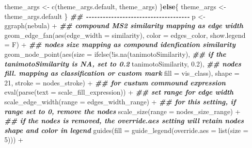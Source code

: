 \documentclass[
]{article}
\newenvironment{Shaded}{\begin{snugshade}}{\end{snugshade}}
\newcommand{\AttributeTok}[1]{\textcolor[rgb]{0.77,0.63,0.00}{#1}}
\newcommand{\ControlFlowTok}[1]{\textcolor[rgb]{0.13,0.29,0.53}{\textbf{#1}}}
\newcommand{\DecValTok}[1]{\textcolor[rgb]{0.00,0.00,0.81}{#1}}
\newcommand{\DocumentationTok}[1]{\textcolor[rgb]{0.56,0.35,0.01}{\textbf{\textit{#1}}}}
\newcommand{\FloatTok}[1]{\textcolor[rgb]{0.00,0.00,0.81}{#1}}
\newcommand{\FunctionTok}[1]{\textcolor[rgb]{0.00,0.00,0.00}{#1}}
\newcommand{\NormalTok}[1]{#1}
\newcommand{\OtherTok}[1]{\textcolor[rgb]{0.56,0.35,0.01}{#1}}
\newcommand{\SpecialCharTok}[1]{\textcolor[rgb]{0.00,0.00,0.00}{#1}}
\begin{document}
\begin{Shaded}
\begin{Highlighting}[]
\NormalTok{      theme\_args }\OtherTok{\textless{}{-}} \FunctionTok{c}\NormalTok{(theme\_args.default, theme\_args)}
\NormalTok{    \}}\ControlFlowTok{else}\NormalTok{\{}
\NormalTok{      theme\_args }\OtherTok{\textless{}{-}}\NormalTok{ theme\_args.default}
\NormalTok{    \}}
    \DocumentationTok{\#\# {-}{-}{-}{-}{-}{-}{-}{-}{-}{-}{-}{-}{-}{-}{-}{-}{-}{-}{-}{-}{-}{-}{-}{-}{-}{-}{-}{-}{-}{-}{-}{-}{-}{-}{-}{-}{-} }
\NormalTok{    p }\OtherTok{\textless{}{-}} \FunctionTok{ggraph}\NormalTok{(nebula) }\SpecialCharTok{+} 
      \DocumentationTok{\#\# compound MS2 similarity mapping as edge width}
      \FunctionTok{geom\_edge\_fan}\NormalTok{(}\FunctionTok{aes}\NormalTok{(}\AttributeTok{edge\_width =}\NormalTok{ similarity), }\AttributeTok{color =}\NormalTok{ edges\_color, }\AttributeTok{show.legend =}\NormalTok{ F) }\SpecialCharTok{+} 
      \DocumentationTok{\#\# nodes size mapping as compound idenfication similarity}
      \FunctionTok{geom\_node\_point}\NormalTok{(}\FunctionTok{aes}\NormalTok{(}\AttributeTok{size =} \FunctionTok{ifelse}\NormalTok{(}\SpecialCharTok{!}\FunctionTok{is.na}\NormalTok{(tanimotoSimilarity),}
                                                \DocumentationTok{\#\# if the tanimotoSimilarity is NA, set to 0.2}
\NormalTok{                                                tanimotoSimilarity, }\FloatTok{0.2}\NormalTok{),}
                                  \DocumentationTok{\#\# nodes fill. mapping as classification or custom mark}
                                  \AttributeTok{fill =}\NormalTok{ vis\_class),}
                              \AttributeTok{shape =} \DecValTok{21}\NormalTok{,}
                              \AttributeTok{stroke =}\NormalTok{ nodes\_stroke) }\SpecialCharTok{+} 
      \DocumentationTok{\#\# for custum commound expression}
      \FunctionTok{eval}\NormalTok{(}\FunctionTok{parse}\NormalTok{(}\AttributeTok{text =}\NormalTok{ scale\_fill\_expression)) }\SpecialCharTok{+}
      \DocumentationTok{\#\# set range for edge width}
      \FunctionTok{scale\_edge\_width}\NormalTok{(}\AttributeTok{range =}\NormalTok{ edges\_width\_range) }\SpecialCharTok{+} 
      \DocumentationTok{\#\# for this setting, if range set to 0, remove the nodes}
      \FunctionTok{scale\_size}\NormalTok{(}\AttributeTok{range =}\NormalTok{ nodes\_size\_range) }\SpecialCharTok{+}
      \DocumentationTok{\#\# if the nodes is removed, the override.aes setting will retain nodes shape and color in legend}
      \FunctionTok{guides}\NormalTok{(}\AttributeTok{fill =} \FunctionTok{guide\_legend}\NormalTok{(}\AttributeTok{override.aes =} \FunctionTok{list}\NormalTok{(}\AttributeTok{size =} \DecValTok{5}\NormalTok{))) }\SpecialCharTok{+}

\end{Highlighting}
\end{Shaded}
\end{document}
